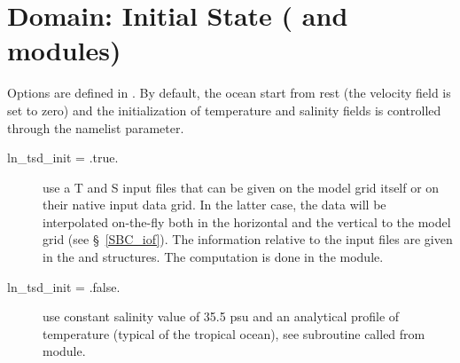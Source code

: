 \documentclass[NEMO_book]{subfiles}
\begin{document}

\section  [Domain: Initial State (\textit{istate and dtatsd})]
		{Domain: Initial State \small{( and  modules)} }
\label{DTA_tsd}

Options are defined in .
By default, the ocean start from rest (the velocity field is set to zero) and the initialization of 
temperature and salinity fields is controlled through the  namelist parameter.
\begin{description}
\item[ln\_tsd\_init = .true.]  use a T and S input files that can be given on the model grid itself or 
on their native input data grid. In the latter case, the data will be interpolated on-the-fly both in the 
horizontal and the vertical to the model grid (see \S~\ref{SBC_iof}). The information relative to the 
input files are given in the  and  structures. 
The computation is done in the  module.
\item[ln\_tsd\_init = .false.] use constant salinity value of 35.5 psu and an analytical profile of temperature
(typical of the tropical ocean), see  subroutine called from  module.
\end{description}
\end{document}
